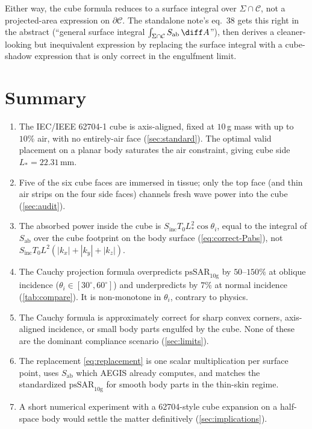 \documentclass[11pt,a4paper]{article}
\theoremstyle{definition}
\theoremstyle{remark}
\newcommand{\Sab}{S_{\mathrm{ab}}}
\newcommand{\Sinc}{S_{\mathrm{inc}}}
\newcommand{\Tzero}{T_0}
\newcommand{\psSAR}{\ensuremath{\mathrm{psSAR}_{10\mathrm{g}}}}
\newcommand{\Lact}{L_{\!*}}
\begin{document}
Either way, the cube formula reduces to a surface integral over
$\Sigma\cap\mathcal{C}$, not a projected-area expression on
$\partial\mathcal{C}$. The standalone note's eq.~38 gets this right
in the abstract (``general surface integral $\int_{\Sigma\cap\mathcal{C}}
\Sab\,\diff A$''), then derives a cleaner-looking but inequivalent
expression by replacing the surface integral with a cube-shadow
expression that is only correct in the engulfment limit.


\section{Summary}
\label{sec:summary}

\begin{enumerate}[leftmargin=2em]
  \item The IEC/IEEE 62704-1 cube is axis-aligned, fixed at $10$\,g
  mass with up to $10\%$ air, with no entirely-air face
  (\cref{sec:standard}). The optimal valid placement on a planar body
  saturates the air constraint, giving cube side
  $\Lact=22.31$\,mm.
  \item Five of the six cube faces are immersed in tissue; only the
  top face (and thin air strips on the four side faces) channels
  fresh wave power into the cube (\cref{sec:audit}).
  \item The absorbed power inside the cube is
  $\Sinc\Tzero\Lact^2\cos\theta_i$, equal to the integral of $\Sab$
  over the cube footprint on the body surface
  (\cref{eq:correct-Pabs}), not $\Sinc\Tzero L^2(|k_x|+|k_y|+|k_z|)$.
  \item The Cauchy projection formula overpredicts $\psSAR$ by
  $50$--$150\%$ at oblique incidence
  ($\theta_i\in[30^\circ,60^\circ]$) and underpredicts by $7\%$ at
  normal incidence (\cref{tab:compare}). It is non-monotone in
  $\theta_i$, contrary to physics.
  \item The Cauchy formula is approximately correct for sharp
  convex corners, axis-aligned incidence, or small body parts
  engulfed by the cube. None of these are the dominant
  compliance scenario (\cref{sec:limits}).
  \item The replacement \cref{eq:replacement} is one scalar
  multiplication per surface point, uses $\Sab$ which AEGIS
  already computes, and matches the standardized $\psSAR$ for
  smooth body parts in the thin-skin regime.
  \item A short numerical experiment with a 62704-style cube
  expansion on a half-space body would settle the matter
  definitively (\cref{sec:implications}).
\end{enumerate}
\end{document}
